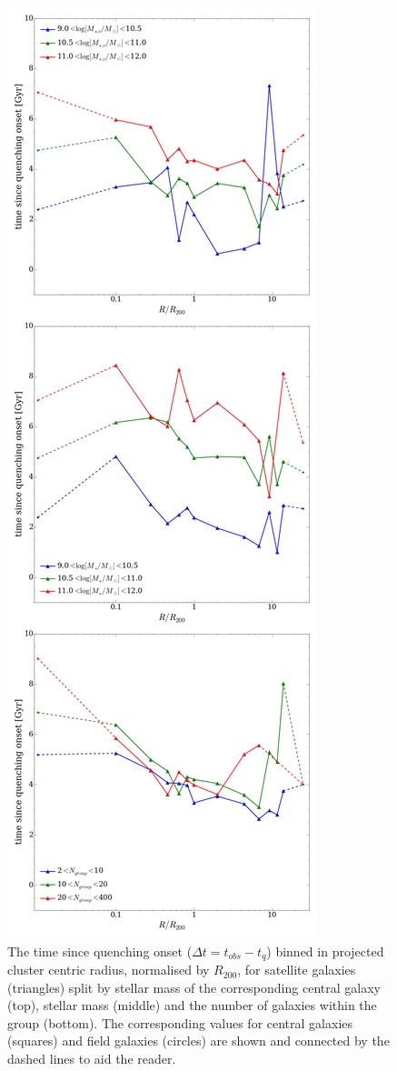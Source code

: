 \documentclass[useAMS,usenatbib]{mn2e}
\begin{document}
\begin{figure}
\includegraphics[height=0.875\textheight]{time_since_quenching_environment_properties_three.png}
\caption{The time since quenching onset ($\Delta t = t_{obs} - t_{q}$) binned in projected cluster centric radius, normalised by $R_{200}$, for satellite galaxies (triangles) split by stellar mass of the corresponding central galaxy (top), stellar mass (middle) and the number of galaxies within the group (bottom). The corresponding values for central galaxies (squares) and field galaxies (circles) are shown and connected by the dashed lines to aid the reader.}
\label{fig:timesinceradius}
\end{figure}
\end{document}
